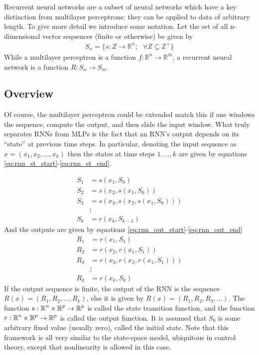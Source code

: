 Recurrent neural networks are a subset of neural networks which have a key distinction from multilayer perceptrons: they can be applied to data of arbitrary length.  To give more detail we introduce some notation.  Let the set of all n-dimensional vector sequences (finite or otherwise) be given by
\begin{align}
S_n = \{s:Z \rightarrow \mathbb{R}^n; \text{ } \forall Z\subseteq\mathbb{Z}^+\}
\end{align}
While a multilayer perceptron is a function $f:\mathbb{R}^n\rightarrow \mathbb{R}^m$, a recurrent neural network is a function $R: S_n \rightarrow S_m$.

\subsection{Overview}

Of course, the multilayer perceptron could be extended match this if one windows the sequence, compute the output, and then slide the input window.  What truly separates RNNs from MLPs is the fact that an RNN's output depends on its ``state'' at previous time steps.  In particular, denoting the input sequence as $x = (x_1,x_2,\dots,x_k)$ then the states at time steps $1,\dots,k$ are given by equations \ref{eq:rnn_st_start}-\ref{eq:rnn_st_end}.

\begin{align}\label{eq:rnn_st_start}
S_1 &= s(x_1,S_0)\\
S_2 &= s(x_2,s(x_1,S_0))\\
S_3 &= s(x_3,s(x_2,s(x_1,S_0)))\\ \nonumber
&\vdots\\
S_k &= r(x_k,S_{k-1})\label{eq:rnn_st_end}
\end{align}
And the outputs are given by equations \ref{eq:rnn_out_start}-\ref{eq:rnn_out_end}
\begin{align}\label{eq:rnn_out_start}
R_1 &= r(x_1,S_1)\\
R_2 &= r(x_2,r(x_1,S_1))\\
R_3 &= r(x_3,r(x_2,r(x_1,S_1)))\\ \nonumber
&\vdots\\
R_k &= r(x_k,S_{k})\label{eq:rnn_out_end}
\end{align}
If the output sequence is finite, the output of the RNN is the sequence $R(x) = (R_1,R_2,\dots,R_k)$, else it is given by $R(x) = (R_1,R_2,R_3,\dots)$.  The function $s:\operatorname*{\mathbb{R}}^n \times \operatorname*{\mathbb{R}}^p \rightarrow \operatorname*{\mathbb{R}}^p$ is called the state transition function, and the function $r:\operatorname*{\mathbb{R}}^n \times \operatorname*{\mathbb{R}}^p \rightarrow \operatorname*{\mathbb{R}}^p$ is called the output function.  It is assumed that $S_0$ is some arbitrary fixed value (usually zero), called the initial state.  Note that this framework is all very similar to the state-space model, ubiquitous in control theory, except that nonlinearity is allowed in this case.

